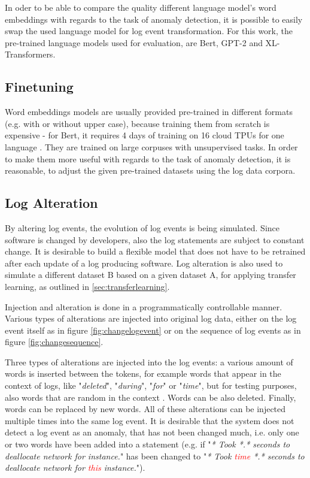 In oder to be able to compare the quality different language model's word embeddings with regards to the task of anomaly detection, it is possible to easily swap the used language model for log event transformation. For this work, the pre-trained language models used for evaluation, are Bert, GPT-2 and XL-Transformers.



\subsection{Finetuning\label{sec:finetuning}}
Word embeddings models are usually provided pre-trained in different formats (e.g. with or without upper case), because training them from scratch is expensive - for Bert, it requires 4 days of training on 16 cloud TPUs for one language \cite{googlebert}. They are trained on large corpuses with unsupervised tasks. In order to make them more useful with regards to the task of anomaly detection, it is reasonable, to adjust the given pre-trained datasets using the log data corpora.

\subsection{Log Alteration\label{sec:logs_alteration}}
By altering log events, the evolution of log events is being simulated. Since software is changed by developers, also the log statements are subject to constant change. It is desirable to build a flexible model that does not have to be retrained after each update of a log producing software. Log alteration is also used to simulate a different dataset B based on a given dataset A, for applying transfer learning, as outlined in \ref{sec:transferlearning}.

Injection and alteration is done in a programmatically controllable manner. Various types of alterations are injected into original log data, either on the log event itself as in figure \ref{fig:changelogevent} or on the sequence of log events as in figure \ref{fig:changesequence}.

Three types of alterations are injected into the log events: a various amount of words is inserted between the tokens, for example words that appear in the context of logs, like "\textit{deleted}", "\textit{during}", "\textit{for}" or "\textit{time}", but for testing purposes, also words that are random in the context . Words can be also deleted. Finally, words can be replaced by new words. All of these alterations can be injected multiple times into the same log event. It is desirable that the system does not detect a log event as an anomaly, that has not been changed much, i.e. only one or two words have been added into a statement (e.g. if "\textit{* Took *.* seconds to deallocate network for instance.}" has been changed to "\textit{* Took \textcolor{red}{time} *.* seconds to deallocate network for \textcolor{red}{this} instance.}").

